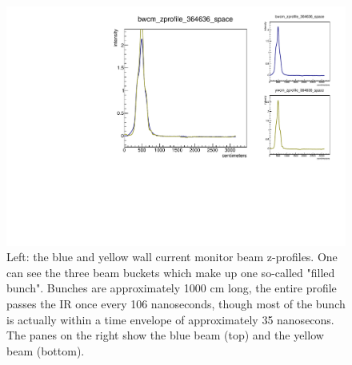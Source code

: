 \begin{figure}
\begin{center}
\includegraphics[width=\linewidth,height=\textheight,keepaspectratio]{../HourglassCorrection/figs/364636_wcm_zprofile}
\caption{ 
Left: the blue and yellow wall current monitor beam z-profiles. One can see the
three beam buckets which make up one so-called "filled bunch". Bunches are
approximately 1000 cm long, the entire profile passes the IR once every 106
nanoseconds, though most of the bunch is actually within a time envelope of
approximately 35 nanosecons. The panes on the right show the blue beam (top)
and the yellow beam (bottom).
}
\label{fig:364636_wcm_zprofile}
\end{center}
\end{figure}
